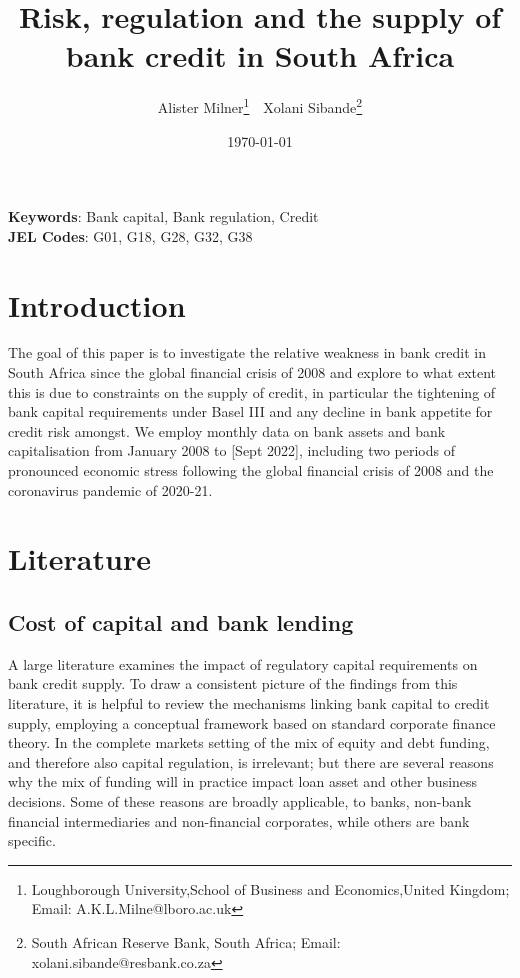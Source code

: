 \documentclass[
]{article}
\author{}
\date{\vspace{-2.5em}}
\begin{document}
\title{Risk, regulation and the supply of bank credit in South Africa}


\author { 
Alister Milner\footnote{Loughborough University,School of Business and Economics,United Kingdom; Email: A.K.L.Milne@lboro.ac.uk}  \,\, 
Xolani Sibande\footnote{South African Reserve Bank, South Africa; Email: xolani.sibande@resbank.co.za}
}
\date{\today}
\maketitle

\begin{abstract}


\end{abstract}

\noindent\textbf{Keywords}: Bank capital, Bank regulation, Credit   \\
\textbf{JEL Codes}: G01, G18, G28, G32, G38
\newpage

\hypertarget{introduction}{%
\section{Introduction}\label{introduction}}

The goal of this paper is to investigate the relative weakness in bank credit in South Africa since the global financial crisis of 2008 and explore to what extent this is due to constraints on the supply of credit, in particular the tightening of bank capital requirements under Basel III and any decline in bank appetite for credit risk amongst.
We employ monthly data on bank assets and bank capitalisation from January 2008 to {[}Sept 2022{]}, including two periods of pronounced economic stress following the global financial crisis of 2008 and the coronavirus pandemic of 2020-21.

\hypertarget{literature}{%
\section{Literature}\label{literature}}

\hypertarget{cost-of-capital-and-bank-lending}{%
\subsection{Cost of capital and bank lending}\label{cost-of-capital-and-bank-lending}}

A large literature examines the impact of regulatory capital requirements on bank credit supply. To draw a consistent picture of the findings from this literature, it is helpful to review the mechanisms linking bank capital to credit supply, employing a conceptual framework based on standard corporate finance theory. In the complete markets setting of \citet{modigliani58} the mix of equity and debt funding, and therefore also capital regulation, is irrelevant; but there are several reasons why the mix of funding will in practice impact loan asset and other business decisions. Some of these reasons are broadly applicable, to banks, non-bank financial intermediaries and non-financial corporates, while others are bank specific.
\end{document}
